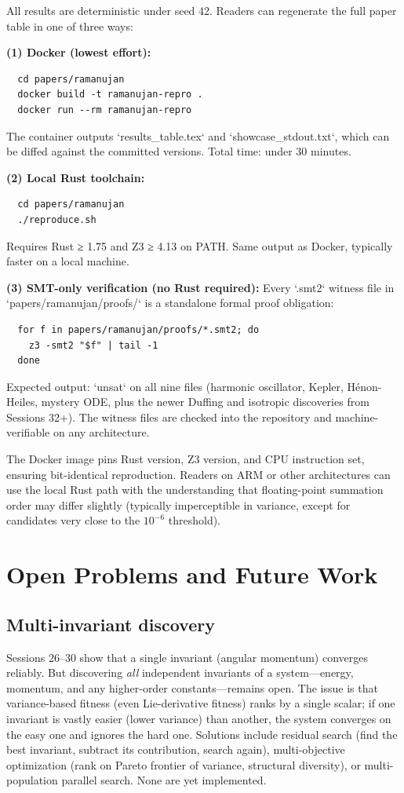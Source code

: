 All results are deterministic under seed 42. Readers can regenerate the full paper table in one of three ways:

\textbf{(1) Docker (lowest effort):}
\begin{verbatim}
  cd papers/ramanujan
  docker build -t ramanujan-repro .
  docker run --rm ramanujan-repro
\end{verbatim}
The container outputs `results_table.tex` and `showcase_stdout.txt`, which can be diffed against the committed versions. Total time: under 30 minutes.

\textbf{(2) Local Rust toolchain:}
\begin{verbatim}
  cd papers/ramanujan
  ./reproduce.sh
\end{verbatim}
Requires Rust ≥ 1.75 and Z3 ≥ 4.13 on PATH. Same output as Docker, typically faster on a local machine.

\textbf{(3) SMT-only verification (no Rust required):}
Every `.smt2` witness file in `papers/ramanujan/proofs/` is a standalone formal proof obligation:
\begin{verbatim}
  for f in papers/ramanujan/proofs/*.smt2; do
    z3 -smt2 "$f" | tail -1
  done
\end{verbatim}
Expected output: `unsat` on all nine files (harmonic oscillator, Kepler, Hénon-Heiles, mystery ODE, plus the newer Duffing and isotropic discoveries from Sessions 32+). The witness files are checked into the repository and machine-verifiable on any architecture.

The Docker image pins Rust version, Z3 version, and CPU instruction set, ensuring bit-identical reproduction. Readers on ARM or other architectures can use the local Rust path with the understanding that floating-point summation order may differ slightly (typically imperceptible in variance, except for candidates very close to the $10^{-6}$ threshold).

\section{Open Problems and Future Work}

\subsection{Multi-invariant discovery}

Sessions 26--30 show that a single invariant (angular momentum) converges reliably. But discovering \textit{all} independent invariants of a system---energy, momentum, and any higher-order constants---remains open. The issue is that variance-based fitness (even Lie-derivative fitness) ranks by a single scalar; if one invariant is vastly easier (lower variance) than another, the system converges on the easy one and ignores the hard one. Solutions include residual search (find the best invariant, subtract its contribution, search again), multi-objective optimization (rank on Pareto frontier of {variance, structural diversity}), or multi-population parallel search. None are yet implemented.

